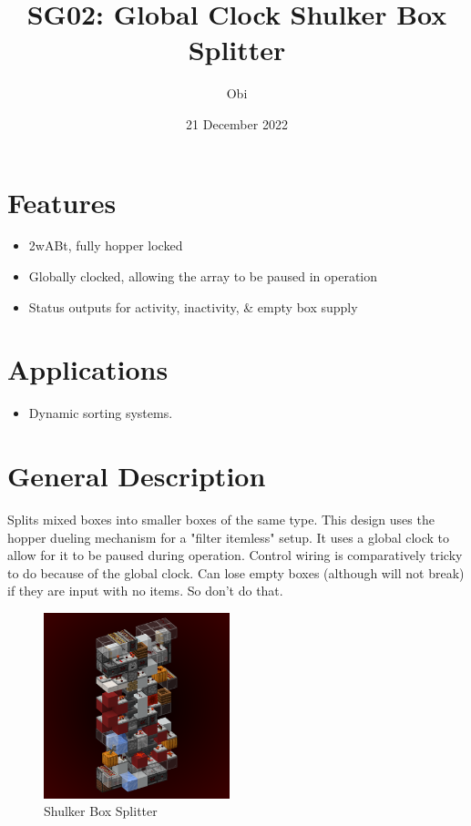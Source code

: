 \documentclass[10pt]{datasheet}
\title{SG02: Global Clock Shulker Box Splitter}
\author{Obi}
\date{21 December 2022}
\begin{document}
\maketitle

\section{Features}

\begin{itemize}
\item{2wABt, fully hopper locked}
\item{Globally clocked, allowing the array to be paused in operation}
\item{Status outputs for activity, inactivity, \& empty box supply}
\end{itemize}

\section{Applications}

\begin{itemize}
\item{Dynamic sorting systems.}
\end{itemize}

\section{General Description}
Splits mixed boxes into smaller boxes of the same type. This design uses the hopper dueling mechanism for a "filter itemless" setup. It uses a global clock to allow for it to be paused during operation. Control wiring is comparatively tricky to do because of the global clock. Can lose empty boxes (although will not break) if they are input with no items. So don't do that. 

\vfill\break

\begin{figure}[H]
    \centering
    \includegraphics[width=0.48\textwidth]{globalclocksplitter1.png}
    \caption{\centering Shulker Box Splitter}
\end{figure}
\end{document}
